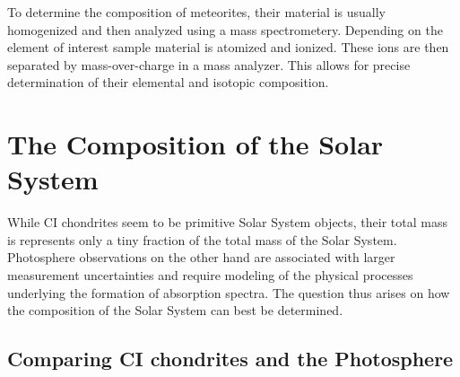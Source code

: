 To determine the composition of meteorites, their material is usually homogenized and then analyzed using a mass spectrometery. Depending on the element of interest sample material is atomized and ionized. These ions are then separated by mass-over-charge in a mass analyzer. This allows for precise determination of their elemental and isotopic composition.




\section{The Composition of the Solar System}

While CI chondrites seem to be primitive Solar System objects, their total mass is represents only a tiny fraction of the total mass of the Solar System. Photosphere observations on the other hand are associated with larger measurement uncertainties and require modeling of the physical processes underlying the formation of absorption spectra. The question thus arises on how the composition of the Solar System can best be determined.

\subsection{Comparing CI chondrites and the Photosphere}

